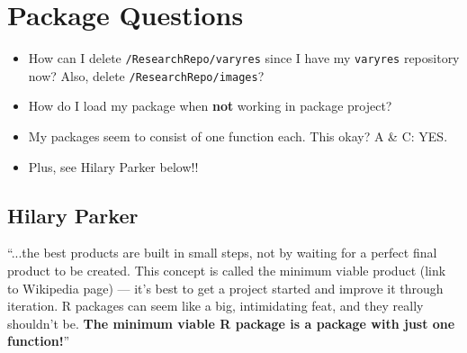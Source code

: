 \documentclass{article}
\begin{document}

\section*{Package Questions}
\begin{itemize}
\item How can I delete \verb|/ResearchRepo/varyres| since I have my \verb|varyres| repository now? Also, delete \verb|/ResearchRepo/images|?
\item How do I load my package when {\bf not} working in package project?
\item My packages seem to consist of one function each. This okay? A \& C: YES. 
\item Plus, see Hilary Parker below!!
\end{itemize}

\subsection*{Hilary Parker}
``...the best products are built in small steps, not by waiting for a perfect final product to be created. This concept is called the minimum viable product (link to Wikipedia page) — it’s best to get a project started and improve it through iteration. R packages can seem like a big, intimidating feat, and they really shouldn’t be. {\bf The minimum viable R package is a package with just one function!}''
\end{document}
